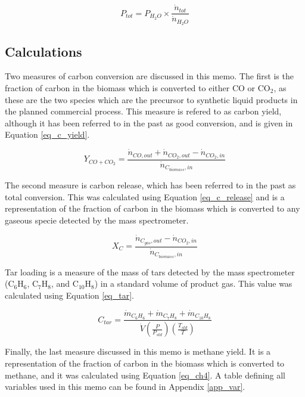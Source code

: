 \documentclass[11pt,twocolumn]{article}
\begin{document}
\begin{equation}
	P_{tot} = P_{H_2O} \times \frac{\dot{n}_{tot}}{\dot{n}_{H_2O}}
	\label{pressure}
\end{equation}


\subsection*{Calculations}

Two measures of carbon conversion are discussed in this memo.  The first is the fraction of carbon in the biomass which is converted to either CO or CO$_2$, as these are the two species which are the precursor to synthetic liquid products in the planned commercial process.  This measure is refered to as carbon yield, although it has been referred to in the past as good conversion, and is given in Equation \ref{eq_c_yield}.

\begin{equation}
	Y_{CO+CO_2} = \frac{\dot{n}_{CO,out}+\dot{n}_{CO_2,out} - \dot{n}_{CO_2,in}}{\dot{n}_{C_{biomass},in}}
	\label{eq_c_yield}
\end{equation}

The second measure is carbon release, which has been referred to in the past as total conversion.  This was calculated using Equation \ref{eq_c_release} and is a representation of the fraction of carbon in the biomass which is converted to any gaseous specie detected by the mass spectrometer.

\begin{equation}
	X_{C} = \frac{\dot{n}_{C_{gas},out}- \dot{n}_{CO_2,in}}{\dot{n}_{C_{biomass},in}}
	\label{eq_c_release}
\end{equation}

Tar loading is a measure of the mass of tars detected by the mass spectrometer (C$_6$H$_6$, C$_7$H$_8$, and C$_{10}$H$_8$) in a standard volume of product gas.  This value was calculated using Equation \ref{eq_tar}.

\begin{equation}
	C_{tar} = \frac{\dot{m}_{C_6H_6}+\dot{m}_{C_7H_8} + \dot{m}_{C_{10}H_8}}{\dot{V}(\frac{P}{P_{std}})(\frac{T_{std}}{T})}
	\label{eq_tar}
\end{equation}

Finally, the last measure discussed in this memo is methane yield.  It is a representation of the fraction of carbon in the biomass which is converted to methane, and it was calculated using Equation \ref{eq_ch4}.  A table defining all variables used in this memo can be found in Appendix \ref{app_var}.
\end{document}
